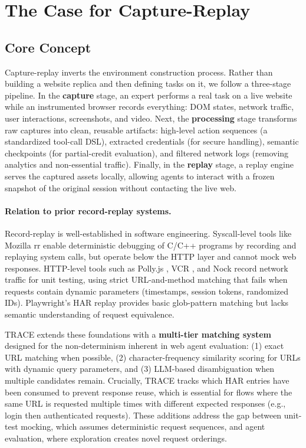 \documentclass[letterpaper]{article}
\begin{document}
\section{The Case for Capture-Replay}
\label{sec:case}

\subsection{Core Concept}

Capture-replay inverts the environment construction process. Rather than building a website replica and then defining tasks on it, we follow a three-stage pipeline. In the \textbf{capture} stage, an expert performs a real task on a live website while an instrumented browser records everything: DOM states, network traffic, user interactions, screenshots, and video. Next, the \textbf{processing} stage transforms raw captures into clean, reusable artifacts: high-level action sequences (a standardized tool-call DSL), extracted credentials (for secure handling), semantic checkpoints (for partial-credit evaluation), and filtered network logs (removing analytics and non-essential traffic). Finally, in the \textbf{replay} stage, a replay engine serves the captured assets locally, allowing agents to interact with a frozen snapshot of the original session without contacting the live web.

\paragraph{Relation to prior record-replay systems.} Record-replay is well-established in software engineering. Syscall-level tools like Mozilla rr \citep{ocallaghan2017rr} enable deterministic debugging of C/C++ programs by recording and replaying system calls, but operate below the HTTP layer and cannot mock web responses. HTTP-level tools such as Polly.js \citep{pollyjs2018}, VCR \citep{vcr2011}, and Nock \citep{nock2011} record network traffic for unit testing, using strict URL-and-method matching that fails when requests contain dynamic parameters (timestamps, session tokens, randomized IDs). Playwright's HAR replay \citep{playwrighthar2023} provides basic glob-pattern matching but lacks semantic understanding of request equivalence.

TRACE extends these foundations with a \textbf{multi-tier matching system} designed for the non-determinism inherent in web agent evaluation: (1) exact URL matching when possible, (2) character-frequency similarity scoring for URLs with dynamic query parameters, and (3) LLM-based disambiguation when multiple candidates remain. Crucially, TRACE tracks which HAR entries have been consumed to prevent response reuse, which is essential for flows where the same URL is requested multiple times with different expected responses (e.g., login then authenticated requests). These additions address the gap between unit-test mocking, which assumes deterministic request sequences, and agent evaluation, where exploration creates novel request orderings.
\end{document}
